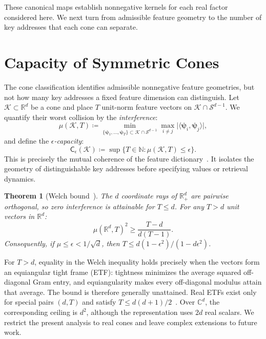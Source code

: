 \documentclass{article}
\newcommand{\1}{\bm{1}}
\newcommand{\defeq}{\coloneqq}
\newcommand{\lrangle}[1]{\langle#1\rangle}
\newcommand{\sphere}[1]{\gS^{#1}}
\def\eps{{\epsilon}}
\def\vpsi{{\bm{\psi}}}
\def\gK{{\mathcal{K}}}
\def\gS{{\mathcal{S}}}
\newcommand{\R}{\mathbb{R}}
\newtheorem{theorem}{Theorem}
\theoremstyle{definition}
\begin{document}
These canonical maps establish nonnegative kernels for each real factor considered here. We next turn
from admissible feature geometry to the number of key addresses that each cone can separate.



\section{Capacity of Symmetric Cones} \label{sec:expressivity}
The cone classification identifies admissible nonnegative feature geometries, but not how many key
addresses a fixed feature dimension can distinguish. Let $\gK\subset\R^d$ be a cone and place $T$
unit-norm feature vectors on $\gK\cap\sphere{d-1}$. We quantify their worst collision by the
\emph{interference}:
\begin{equation}
  \mu(\gK,T)
  \defeq
  \min_{\{\bm{\vpsi}_1,\dots,\bm{\vpsi}_T\}\subset\gK\cap\sphere{d-1}}
  \max_{i\neq j}
  \big|\lrangle{\bm{\vpsi}_i,\bm{\vpsi}_j}\big|,
  \label{eq:mu-def}
\end{equation}
and define the \emph{$\eps$-capacity}:
\begin{equation}
  \mathsf{C}_{\eps}(\gK)
  \defeq
  \sup\{T\in\mathbb{N}:\mu(\gK,T)\le\eps\}.
  \label{eq:eps-capacity}
\end{equation}
This is precisely the mutual coherence of the feature dictionary~\citep{donoho03optimally}. It
isolates the geometry of distinguishable key addresses before specifying values or retrieval
dynamics.

\begin{theorem}[Welch bound~\citep{welch74lower}]
  \label{thm:welchbound}
  The $d$ coordinate rays of $\R_+^d$ are pairwise orthogonal, so zero interference is attainable
  for $T\le d$. For any $T>d$ unit vectors in $\R^d$:
  \begin{equation}
    \mu(\R^d,T)^2\ge \frac{T-d}{d(T-1)}.
  \end{equation}
  Consequently, if $\mu\le\eps<1/\sqrt d$, then
  $T\le d(1-\eps^2)/(1-d\eps^2)$.
\end{theorem}
For $T>d$, equality in the Welch inequality holds precisely when the vectors form an equiangular tight frame
(ETF): tightness minimizes the average squared off-diagonal Gram entry, and equiangularity makes
every off-diagonal modulus attain that average. The bound is therefore generally unattained. Real
ETFs exist only for special pairs $(d,T)$ and satisfy $T\le d(d+1)/2$~\citep{fickus16etf}. Over
$\mathbb C^d$, the corresponding ceiling is $d^2$, although the representation uses $2d$ real
scalars. We restrict the present analysis to real cones and leave complex extensions to future work.
\end{document}
